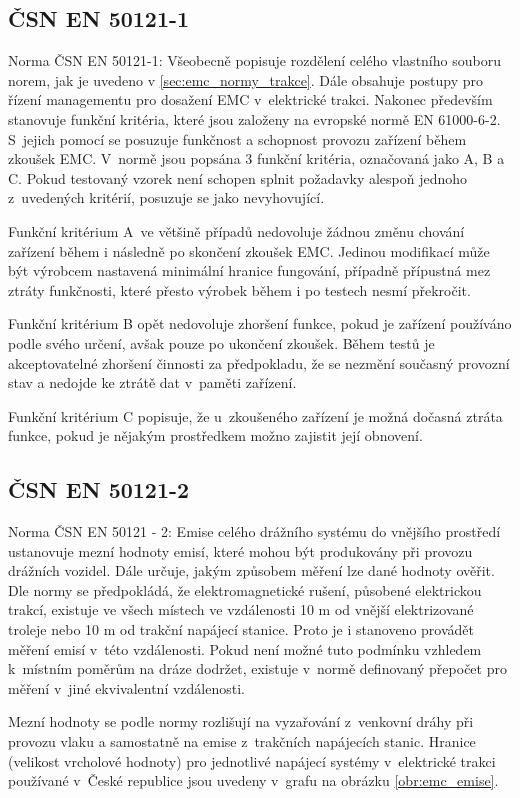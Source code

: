 \subsection{ČSN EN 50121-1}
Norma ČSN EN 50121-1: Všeobecně popisuje rozdělení celého vlastního souboru norem, jak je uvedeno v \ref{sec:emc_normy_trakce}. Dále obsahuje postupy pro řízení managementu pro dosažení EMC v~elektrické trakci. Nakonec především stanovuje funkční kritéria, které jsou založeny na evropské normě EN 61000-6-2. S~jejich pomocí se posuzuje funkčnost a schopnost provozu zařízení během zkoušek EMC. V~normě jsou popsána 3 funkční kritéria, označovaná jako A, B a C. Pokud testovaný vzorek není schopen splnit požadavky alespoň jednoho z~uvedených kritérií, posuzuje se jako nevyhovující.

Funkční kritérium A~ve většině případů nedovoluje žádnou změnu chování zařízení během i následně po skončení zkoušek EMC. Jedinou modifikací může být výrobcem nastavená minimální hranice fungování, případně přípustná mez ztráty funkčnosti, které přesto výrobek během i po testech nesmí překročit.

Funkční kritérium B opět nedovoluje zhoršení funkce, pokud je zařízení používáno podle svého určení, avšak pouze po ukončení zkoušek. Během testů je akceptovatelné zhoršení činnosti za předpokladu, že se nezmění současný provozní stav a nedojde ke ztrátě dat v~paměti zařízení.

Funkční kritérium C popisuje, že u~zkoušeného zařízení je možná dočasná ztráta funkce, pokud je nějakým prostředkem možno zajistit její obnovení.

\subsection{ČSN EN 50121-2}
Norma ČSN EN 50121 - 2: Emise celého drážního  systému do vnějšího prostředí ustanovuje mezní hodnoty emisí, které mohou být produkovány při provozu drážních vozidel. Dále určuje, jakým způsobem měření lze dané hodnoty ověřit. Dle normy se předpokládá, že elektromagnetické rušení, působené elektrickou trakcí, existuje ve všech místech ve vzdálenosti 10 m od vnější elektrizované troleje nebo 10 m od trakční napájecí stanice. Proto je i stanoveno provádět měření emisí v~této vzdálenosti. Pokud není možné tuto podmínku vzhledem k~místním poměrům na dráze dodržet, existuje v~normě definovaný přepočet pro měření v~jiné ekvivalentní vzdálenosti. 

Mezní hodnoty se podle normy rozlišují na vyzařování z~venkovní dráhy při provozu vlaku a samostatně na emise z~trakčních napájecích stanic. Hranice (velikost vrcholové hodnoty) pro jednotlivé napájecí systémy v~elektrické trakci používané v~České republice jsou uvedeny v~grafu na obrázku \ref{obr:emc_emise}.

